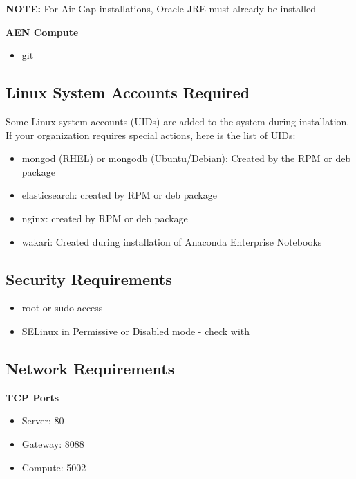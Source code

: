 \documentclass[letterpaper,10pt,openany,oneside]{sphinxmanual}
\begin{document}
\textbf{NOTE:} For Air Gap installations, Oracle JRE must already be
installed

\textbf{AEN Compute}
\begin{itemize}
\item {} 
git

\end{itemize}


\subsection{Linux System Accounts Required}
\label{AnacondaEnterpriseNotebooks:linux-system-accounts-required}
Some Linux system accounts (UIDs) are added to the system during installation.
If your organization requires special actions, here is the list of UIDs:
\begin{itemize}
\item {} 
mongod (RHEL) or mongodb (Ubuntu/Debian): Created by the RPM or deb package

\item {} 
elasticsearch: created by RPM or deb package

\item {} 
nginx: created by RPM or deb package

\item {} 
wakari: Created during installation of Anaconda Enterprise Notebooks

\end{itemize}


\subsection{Security Requirements}
\label{AnacondaEnterpriseNotebooks:security-requirements}\begin{itemize}
\item {} 
root or sudo access

\item {} 
SELinux in Permissive or Disabled mode - check with 

\end{itemize}


\subsection{Network Requirements}
\label{AnacondaEnterpriseNotebooks:network-requirements}
\textbf{TCP Ports}
\begin{itemize}
\item {} 
Server: 80

\item {} 
Gateway: 8088

\item {} 
Compute: 5002

\end{itemize}
\end{document}
